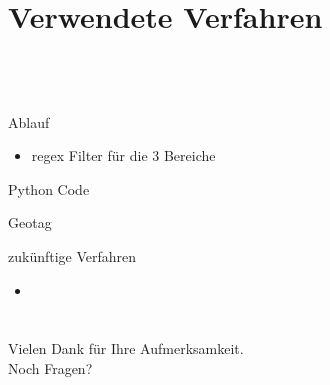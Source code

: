 \documentclass[12pt]{beamer}
\begin{document}
\begin{large}
\section{Verwendete Verfahren}
 \subsection*{~}
\begin{frame}{Ablauf}
 \begin{itemize}
  \item regex Filter für die 3 Bereiche
 \end{itemize}
\end{frame}

\begin{frame}{Python Code}

\end{frame}

\begin{frame}{Geotag}

\end{frame}

\begin{frame}{zukünftige Verfahren}
 \begin{itemize}
   \item 
 \end{itemize}
\end{frame}


\section*{}
\begin{frame}
\centering
{\Large Vielen Dank für Ihre Aufmerksamkeit. \\ Noch Fragen?}
\end{frame}

\end{large}
\end{document}
